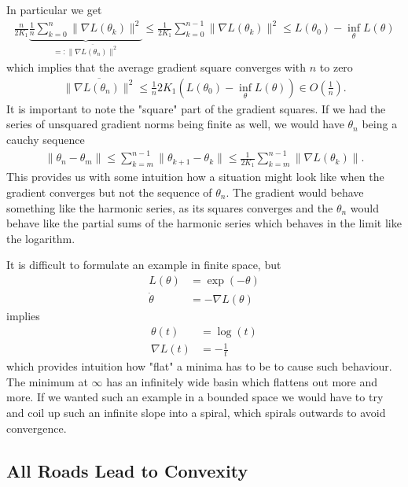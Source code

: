 In particular we get
%
\begin{align*}
	\tfrac{n}{2K_1}
	\underbrace{\tfrac{1}{n} \sum_{k=0}^n \|\nabla L(\theta_k)\|^2}_{
		=: \overline{\|\nabla L(\theta_n)\|^2}
	}
	\le \tfrac{1}{2K_1}\sum_{k=0}^{n-1} \|\nabla L(\theta_k)\|^2 
	\le L(\theta_0) - \inf_\theta L(\theta)
\end{align*}
%
which implies that the average gradient square converges with \(n\) to zero
%
\begin{align*}
	\overline{\|\nabla L(\theta_n)\|^2}
	\le \tfrac{1}{n}2 K_1 (L(\theta_0) - \inf_\theta L(\theta)) \in O(\tfrac{1}{n}).
\end{align*}
%
It is important to note the "square" part of the gradient squares. If we had the
series of unsquared gradient norms being finite as well, we would have
\(\theta_n\) being a cauchy sequence
%
\begin{align*}
	\|\theta_n - \theta_m \|
	\le \sum_{k=m}^{n-1} \|\theta_{k+1} - \theta_k\|
	\le \tfrac{1}{2K_1} \sum_{k=m}^{n-1} \|\nabla L(\theta_k)\|.
\end{align*}
%
This provides us with some intuition how a situation might look like when the
gradient converges but not the sequence of \(\theta_n\). The gradient would
behave something like the harmonic series, as its squares converges and the
\(\theta_n\) would behave like the partial sums of the harmonic series which
behaves in the limit like the logarithm.

It is difficult to formulate an example in finite space, but
%
\begin{align*}
	L(\theta) &= \exp(-\theta) \\
	\dot{\theta} &= -\nabla L(\theta)
\end{align*}
%
implies
%
\begin{align*}
	\theta(t) &= \log(t)\\
	\nabla L(t) &= -\tfrac1t
\end{align*}
%
which provides intuition how "flat" a minima has to be to cause such behaviour.
The minimum at \(\infty\) has an infinitely wide basin which flattens out
more and more. If we wanted such an example in a bounded space we would have
to try and coil up such an infinite slope into a spiral, which spirals outwards
to avoid convergence.

\subsection{All Roads Lead to Convexity}


